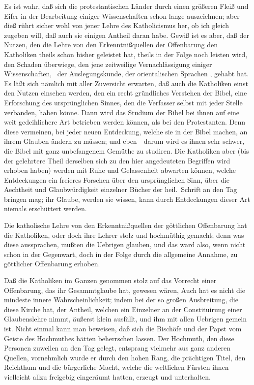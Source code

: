  Es ist wahr, daß sich die protestantischen Länder durch einen größeren Fleiß und Eifer in der Bearbeitung einiger Wissenschaften schon lange auszeichnen; aber dieß rührt sicher wohl  von jener Lehre des Katholicismus her, ob ich gleich zugeben will, daß auch sie einigen Antheil daran habe. Gewiß ist es aber, daß der Nutzen, den die Lehre von den Erkenntnißquellen der Offenbarung den Katholiken theils schon bisher geleistet hat, theils in der Folge noch leisten wird, den Schaden überwiege, den jene zeitweilige Vernachlässigung einiger Wissenschaften, \zB\ der Auslegungskunde, der orientalischen Sprachen \ua , gehabt hat. Es läßt sich nämlich mit aller Zuversicht erwarten, daß auch die Katholiken einst den Nutzen einsehen werden, den ein recht gründliches Verstehen der Bibel, eine Erforschung des ursprünglichen Sinnes, den die Verfasser selbst mit jeder Stelle verbanden, haben könne. Dann wird das Studium der Bibel bei ihnen auf eine weit gedeihlichere Art betrieben werden können, als bei den Protestanten. Denn diese vermeinen, bei jeder neuen Entdeckung, welche sie in der Bibel machen, an ihrem Glauben ändern zu müssen; und eben~\ darum wird es ihnen sehr schwer, die Bibel mit ganz unbefangenem Gemüthe zu studiren. Die Katholiken aber (bis der gelehrtere Theil derselben sich zu den hier angedeuteten Begriffen wird erhoben haben) werden mit Ruhe und Gelassenheit abwarten können, welche Entdeckungen ein freieres Forschen über den ursprünglichen Sinn, über die Aechtheit und Glaubwürdigkeit einzelner Bücher der heil.\ Schrift an den Tag bringen mag; ihr Glaube, werden sie wissen, kann durch Entdeckungen dieser Art niemals erschüttert werden.\par
{} Die katholische Lehre von den Erkenntnißquellen der göttlichen Offenbarung hat die Katholiken, oder doch ihre Lehrer stolz und hochmüthig gemacht; denn was diese aussprachen, mußten die Uebrigen glauben, und das ward also, wenn nicht schon in der Gegenwart, doch in der Folge durch die allgemeine Annahme, zu göttlicher Offenbarung erhoben.\par
{} Daß die Katholiken im Ganzen genommen stolz auf das Vorrecht einer Offenbarung, das ihr Gesammtglaube hat, gewesen wären,  Auch hat es nicht die mindeste innere Wahrscheinlichkeit; indem bei der so großen Ausbreitung, die diese Kirche hat, der Antheil, welchen ein Einzelner an der Constituirung einer Glaubenslehre nimmt, äußerst klein ausfällt, und ihm mit allen Uebrigen gemein ist. Nicht einmal kann man beweisen, daß sich die Bischöfe und der Papst  vom Geiste des Hochmuthes hätten beherrschen lassen. Der Hochmuth, den diese Personen zuweilen an den Tag gelegt, entsprang vielmehr aus ganz anderen Quellen, vornehmlich wurde er durch den hohen Rang, die prächtigen Titel, den Reichthum und die bürgerliche Macht, welche die weltlichen Fürsten ihnen vielleicht allzu freigebig eingeräumt hatten, erzeugt und unterhalten.\par

